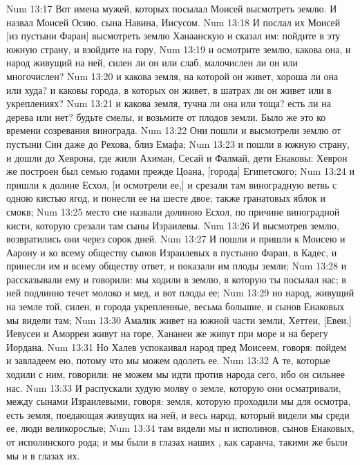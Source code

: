 \vs Num 13:17 Вот имена мужей, которых посылал Моисей высмотреть землю. И назвал Моисей Осию, сына Навина, Иисусом.
\rsbpar\vs Num 13:18 И послал их Моисей [из пустыни Фаран] высмотреть землю Ханаанскую и сказал им: пойдите в эту южную страну, и взойдите на гору,
\vs Num 13:19 и осмотрите землю, какова она, и народ живущий на ней, силен ли он или слаб, малочислен ли он или многочислен?
\vs Num 13:20 и какова земля, на которой он живет, хороша ли она или худа? и каковы города, в которых он живет, в шатрах ли он живет или в укреплениях?
\vs Num 13:21 и какова земля, тучна ли она или тоща? есть ли на  дерева или нет? будьте смелы, и возьмите от плодов земли. Было же это ко времени созревания винограда.
\vs Num 13:22 Они пошли и высмотрели землю от пустыни Син даже до Рехова, близ Емафа;
\vs Num 13:23 и пошли в южную страну, и дошли до Хеврона, где жили Ахиман, Сесай и Фалмай, дети Енаковы: Хеврон же построен был семью годами прежде Цоана, [города] Египетского;
\vs Num 13:24 и пришли к долине Есхол, [и осмотрели ее,] и срезали там виноградную ветвь с одною кистью ягод, и понесли ее на шесте двое;  также гранатовых яблок и смокв;
\vs Num 13:25 место сие назвали долиною Есхол, по причине виноградной кисти, которую срезали там сыны Израилевы.
\vs Num 13:26 И высмотрев землю, возвратились они через сорок дней.
\vs Num 13:27 И пошли и пришли к Моисею и Аарону и ко всему обществу сынов Израилевых в пустыню Фаран, в Кадес, и принесли им и всему обществу ответ, и показали им плоды земли;
\vs Num 13:28 и рассказывали ему и говорили: мы ходили в землю, в которую ты посылал нас; в ней подлинно течет молоко и мед, и вот плоды ее;
\vs Num 13:29 но народ, живущий на земле той, силен, и города укрепленные, весьма большие, и сынов Енаковых мы видели там;
\vs Num 13:30 Амалик живет на южной части земли, Хеттеи, [Евеи,] Иевусеи и Аморреи живут на горе, Хананеи же живут при море и на берегу Иордана.
\vs Num 13:31 Но Халев успокаивал народ пред Моисеем, говоря: пойдем и завладеем ею, потому что мы можем одолеть ее.
\vs Num 13:32 А те, которые ходили с ним, говорили: не можем мы идти против народа сего, ибо он сильнее нас.
\vs Num 13:33 И распускали худую молву о земле, которую они осматривали, между сынами Израилевыми, говоря: земля, которую проходили мы для осмотра, есть земля, поедающая живущих на ней, и весь народ, который видели мы среди ее, люди великорослые;
\vs Num 13:34 там видели мы и исполинов, сынов Енаковых, от исполинского рода; и мы были в глазах наших , как саранча, такими же были мы и в глазах их.
